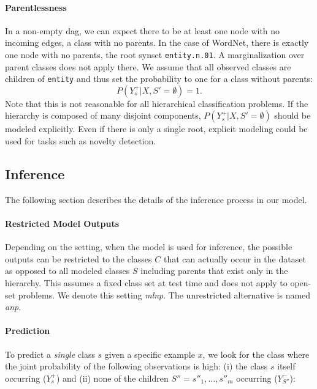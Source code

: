 \documentclass[10pt,twocolumn,letterpaper]{article}
\begin{document}
\paragraph{Parentlessness}
In a non-empty \gls{dag}, we can expect there to be at least one node with no incoming edges, \ie a
class with no parents. In the case of WordNet, there is exactly one node with no parents, the root synset \texttt{entity.n.01}.
A marginalization over parent classes does not apply there. We assume that all observed
classes are children of \texttt{entity} and thus set the probability to one for a class without parents:
\begin{equation}
P(Y_s^+|X,S'=\emptyset) = 1.
\label{eqn:entity}
\end{equation}
Note that this is not reasonable for all hierarchical classification problems. If the
hierarchy is composed of many disjoint components, $P(Y_s^+|X,S'=\emptyset)$ should
be modeled explicitly. Even if there is only a single root, explicit modeling could
be used for tasks such as novelty detection.

\subsection{Inference}
\label{sec:inference}
The following section describes the details of the inference process in our model.

\paragraph{Restricted Model Outputs}
\label{sec:mlnp}
Depending on the setting, when the model is used for inference, the possible outputs can be restricted
to the classes $C$ that can actually occur in the dataset as opposed to all modeled
classes $S$ including parents that exist only in the hierarchy. This assumes a fixed class set at test time and does not apply to open-set problems.
We denote this setting \emph{\gls{mlnp}}. The unrestricted alternative is named \emph{\gls{anp}}.

\paragraph{Prediction} To predict a \emph{single} class $s$ given a specific example $x$, we look for the class where
the joint probability of the following observations is high: (i) the class $s$ itself occurring ($Y_s^+$)
and (ii) none of the children $S''=s''_1,\ldots,s''_m$ occurring ($Y_{S''}^-$):
\end{document}
